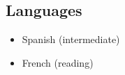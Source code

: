 \documentclass[
  12pt,
  letterpaper,
]{article}
\providecommand{\tightlist}{%
  \setlength{\itemsep}{0pt}\setlength{\parskip}{0pt}}
\begin{document}
\hypertarget{languages}{%
\subsection{Languages}\label{languages}}

\begin{itemize}
\tightlist
\item
Spanish (intermediate)
\item
French (reading)
\end{itemize}
\end{document}
